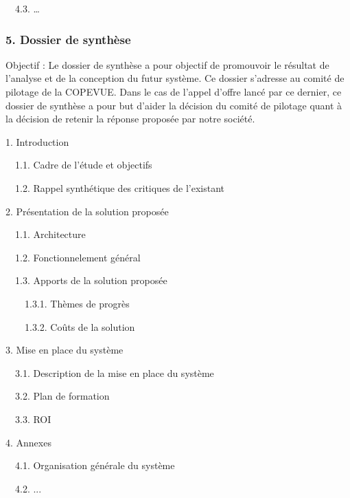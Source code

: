 \documentclass{article}
\begin{document}
\ \ 4.3. …


\bigskip

\subsubsection[5. Dossier de synthèse]{5. Dossier de synthèse}
Objectif : Le dossier de synthèse a pour objectif de promouvoir le
résultat de l’analyse et de la conception du futur système. Ce dossier
s’adresse au comité de pilotage de la COPEVUE. Dans le cas de l’appel
d’offre lancé par ce dernier, ce dossier de synthèse a pour but d’aider
la décision du comité de pilotage quant à la décision de retenir la
réponse proposée par notre société.

1. Introduction

\ \ 1.1. Cadre de l’étude et objectifs

\ \ 1.2. Rappel synthétique des critiques de l’existant

2. Présentation de la solution proposée

\ \ 1.1. Architecture

\ \ 1.2. Fonctionnelement général

\ \ 1.3. Apports de la solution proposée

\ \ \ \ 1.3.1. Thèmes de progrès

\ \ \ \ 1.3.2. Coûts de la solution

3. Mise en place du système

\ \ 3.1. Description de la mise en place du système

\ \ 3.2. Plan de formation

\ \ 3.3. ROI

4. Annexes

\ \ 4.1. Organisation générale du système

\ \ 4.2. ...
\end{document}
